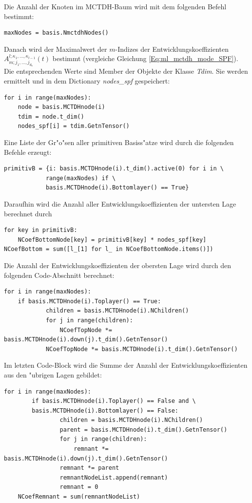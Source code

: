Die Anzahl der Knoten im MCTDH-Baum wird mit dem folgenden Befehl bestimmt:
\begin{verbatim}
maxNodes = basis.NmctdhNodes()
\end{verbatim}
Danach wird der Maximalwert der $m$-Indizes der Entwicklungskoeffizienten $A^{l;\kappa_{1},...,\kappa_{l-1}}_{m;j_1,...,j_{d_{\kappa}}}(t)$ 
bestimmt (vergleiche Gleichung \ref{Eq:ml_mctdh_mode_SPF}).
Die entsprechenden Werte sind Member der Objekte der Klasse \textit{Tdim}.
Sie werden ermittelt und in dem Dictionary \textit{nodes\_spf} gespeichert:
\begin{verbatim}
for i in range(maxNodes):
    node = basis.MCTDHnode(i)
    tdim = node.t_dim()
    nodes_spf[i] = tdim.GetnTensor() 
\end{verbatim}

Eine Liste der Gr"o"sen aller primitiven Basiss"atze wird durch die folgenden Befehle erzeugt:
\begin{verbatim}
primitivB = {i: basis.MCTDHnode(i).t_dim().active(0) for i in \
            range(maxNodes) if \
            basis.MCTDHnode(i).Bottomlayer() == True}
\end{verbatim}

Daraufhin wird die Anzahl aller Entwicklungskoeffizienten der untersten Lage berechnet durch
\begin{verbatim}
for key in primitivB:
    NCoefBottomNode[key] = primitivB[key] * nodes_spf[key]
NCoefBottom = sum([l_[1] for l_ in NCoefBottomNode.items()])
\end{verbatim}

Die Anzahl der Entwicklungskoeffizienten der obersten Lage wird durch den folgenden Code-Abschnitt berechnet:

\begin{verbatim}
for i in range(maxNodes):
    if basis.MCTDHnode(i).Toplayer() == True:
            children = basis.MCTDHnode(i).NChildren()
            for j in range(children):
                NCoefTopNode *= basis.MCTDHnode(i).down(j).t_dim().GetnTensor()
            NCoefTopNode *= basis.MCTDHnode(i).t_dim().GetnTensor()
\end{verbatim}

Im letzten Code-Block wird die Summe der Anzahl der Entwicklungskoeffizienten aus
den "ubrigen Lagen gebildet:

\begin{verbatim}
for i in range(maxNodes):
        if basis.MCTDHnode(i).Toplayer() == False and \
        basis.MCTDHnode(i).Bottomlayer() == False:
                children = basis.MCTDHnode(i).NChildren()
                parent = basis.MCTDHnode(i).t_dim().GetnTensor()
                for j in range(children):
                    remnant *= basis.MCTDHnode(i).down(j).t_dim().GetnTensor() 
                remnant *= parent
                remnantNodeList.append(remnant)
                remnant = 0
    NCoefRemnant = sum(remnantNodeList)
\end{verbatim}

